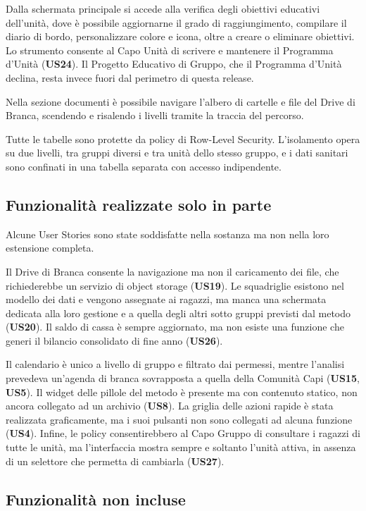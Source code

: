 \documentclass[11pt]{article}
\numberwithin{figure}{section}
\begin{document}
Dalla schermata principale si accede alla verifica degli obiettivi educativi dell'unità, dove è possibile aggiornarne il grado di raggiungimento, compilare il diario di bordo, personalizzare colore e icona, oltre a creare o eliminare obiettivi. Lo strumento consente al Capo Unità di scrivere e mantenere il Programma d'Unità (\textbf{US24}). Il Progetto Educativo di Gruppo, che il Programma d'Unità declina, resta invece fuori dal perimetro di questa release.

Nella sezione documenti è possibile navigare l'albero di cartelle e file del Drive di Branca, scendendo e risalendo i livelli tramite la traccia del percorso.

Tutte le tabelle sono protette da policy di Row-Level Security. L'isolamento opera su due livelli, tra gruppi diversi e tra unità dello stesso gruppo, e i dati sanitari sono confinati in una tabella separata con accesso indipendente.

\subsection{Funzionalità realizzate solo in parte}

Alcune User Stories sono state soddisfatte nella sostanza ma non nella loro estensione completa.

Il Drive di Branca consente la navigazione ma non il caricamento dei file, che richiederebbe un servizio di object storage (\textbf{US19}). Le squadriglie esistono nel modello dei dati e vengono assegnate ai ragazzi, ma manca una schermata dedicata alla loro gestione e a quella degli altri sotto gruppi previsti dal metodo (\textbf{US20}). Il saldo di cassa è sempre aggiornato, ma non esiste una funzione che generi il bilancio consolidato di fine anno (\textbf{US26}).

Il calendario è unico a livello di gruppo e filtrato dai permessi, mentre l'analisi prevedeva un'agenda di branca sovrapposta a quella della Comunità Capi (\textbf{US15}, \textbf{US5}). Il widget delle pillole del metodo è presente ma con contenuto statico, non ancora collegato ad un archivio (\textbf{US8}). La griglia delle azioni rapide è stata realizzata graficamente, ma i suoi pulsanti non sono collegati ad alcuna funzione (\textbf{US4}). Infine, le policy consentirebbero al Capo Gruppo di consultare i ragazzi di tutte le unità, ma l'interfaccia mostra sempre e soltanto l'unità attiva, in assenza di un selettore che permetta di cambiarla (\textbf{US27}).

\subsection{Funzionalità non incluse}
\end{document}
